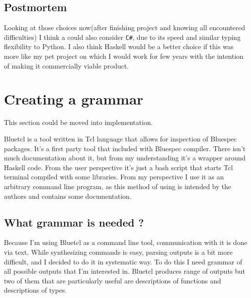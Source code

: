 \documentclass[14pt]{report}
\begin{document}
\subsection{Postmortem}
Looking at those choices now(after finishing project and knowing all encountered difficulties) I think a could also consider \verb!C#!, due to its speed and similar typing flexibility to Python. I also think Haskell would be a better choice if this was more like my pet project on which I would work for few years with the intention of making it commercially viable product.

\section{Creating a grammar}
This section could be moved into implementation.

\begin{tcolorbox}[title=Bluetcl]
    Bluetcl is a tool written in Tcl language that allows for inspection of Bluespec packages. It's a first party tool that included with Bluespec compiler. There isn't much documentation about it, but from my understanding it's a wrapper around Haskell code.
    From the user perspective it's just a bash script that starts Tcl terminal compiled with some libraries. From my perspective I use it as an arbitrary command line program, as this method of using is intended by the authors and contains some documentation.
\end{tcolorbox}
\subsection{What grammar is needed ?}
Because I'm using Bluetcl as a command line tool, communication with it is done via text. 
While synthesizing commands is easy, parsing outputs is a bit more difficult, and I decided to do it in systematic way. 
To do this I need grammar of all possible outputs that I'm interested in. 
Bluetcl produces range of outputs but two of them that are particularly useful are descriptions of functions and descriptions of types.
\end{document}
